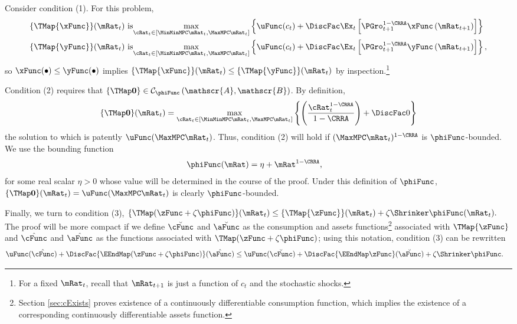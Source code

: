 \documentclass[\econtexRoot/BufferStockTheory.tex]{subfiles}
\begin{document}
Consider condition (1). For this problem,
\begin{align*}
\{\TMap{\mathfrak{\xFunc}}\}(\mRat_{t}) &\mbox{~is}\underset{\cRat_{t} \in
[\MinMinMPC \mRat_{t}, \MaxMPC \mRat_{t}]
}\max \left\{
\uFunc(c_{t})+\DiscFac \Ex_{t}\left[ {\PGro}_{t+1}^{1-\CRRA }{\mathfrak{\xFunc}}
\left( {\mRat}_{t+1}\right) \right] \right\}  \notag  \label{eq:condition1}
\\
\{\TMap{\mathfrak{\yFunc}}\}(\mRat_{t}) &\mbox{~is}\underset{\cRat_{t} \in
[\MinMinMPC \mRat_{t}, \MaxMPC \mRat_{t}]
}\max \left\{
\uFunc(c_{t})+\DiscFac \Ex_{t}\left[ {\PGro}_{t+1}^{1-\CRRA }{\mathfrak{\yFunc}}
\left( {\mRat}_{t+1}\right) \right] \right\} ,  \notag
\end{align*}%
so ${\mathfrak{\xFunc}}(\bullet) \leq {\mathfrak{\yFunc}}(\bullet)$ implies $\{\TMap{\mathfrak{\xFunc}}\}(\mRat_{t}) \leq \{\TMap{\mathfrak{\yFunc}} \}(\mRat_{t})$ by inspection.\footnote{For a fixed $\mRat_{t}$, recall that ${\mRat}_{t+1}$ is just a function of $c_{t}$ and the
stochastic shocks.}

Condition (2) requires that $\{\TMap\mathbf{0}\}\in \mathcal{C}_{\phiFunc}\left(\mathscr{A},\mathscr{B}\right)$. By definition,
\begin{equation*}
\{\TMap \mathbf{0}\}(\mRat_{t}) = \max_{\cRat_{t} \in
[\MinMinMPC \mRat_{t}, \MaxMPC \mRat_{t}]
}\left\{ \left( \frac{\cRat_{t}^{1-\CRRA }}{1-\CRRA }\right) +\DiscFac 0\right\}
\end{equation*}
the solution to which is patently
$\uFunc(\MaxMPC \mRat_{t})$. Thus, condition (2)
will hold if $(\MaxMPC \mRat_{t})^{1-\CRRA}$ is $\phiFunc$-bounded.  We use
the bounding function
\begin{align}
  \label{eq:phiFunc}
  \phiFunc(\mRat)  & = \eta + \mRat^{1-\CRRA},
\end{align}
for some real scalar $\eta > 0$ whose value will be determined in the
course of the proof. Under this definition of $\phiFunc$,
$\{\TMap\mathbf{0}\}(\mRat_{t})= \uFunc(\MaxMPC \mRat_{t})$
is clearly
$\phiFunc$-bounded.

Finally, we turn to condition (3), $\{\TMap({\zFunc} +\zeta\phiFunc
)\}(\mRat_{t}) \leq \{\TMap{\zFunc}\}(\mRat_{t}) +\zeta \Shrinker
\phiFunc(\mRat_{t}).$ The proof will be more compact if we define
$\breve{\cFunc}$ and $\breve{\aFunc}$ as the consumption and assets
functions\footnote{Section \ref{sec:cExists} proves existence of a
  continuously differentiable consumption function, which implies the
  existence of a corresponding continuously differentiable assets
  function.}  associated with $\TMap{\zFunc}$ and $\hat{\cFunc}$ and
$\hat{\aFunc}$ as the functions associated with $\TMap({\zFunc+\zeta
  \phiFunc})$; using this notation, condition (3) can be rewritten
\begin{align*}
\uFunc(\hat{\cFunc})+\DiscFac \{\EEndMap (\zFunc+\zeta \phiFunc) \}(\hat{\aFunc})  & \leq  \uFunc(\breve{\cFunc})+\DiscFac \{\EEndMap \zFunc \}(\breve{\aFunc})  + \zeta \Shrinker \phiFunc.
\end{align*}
\end{document}
